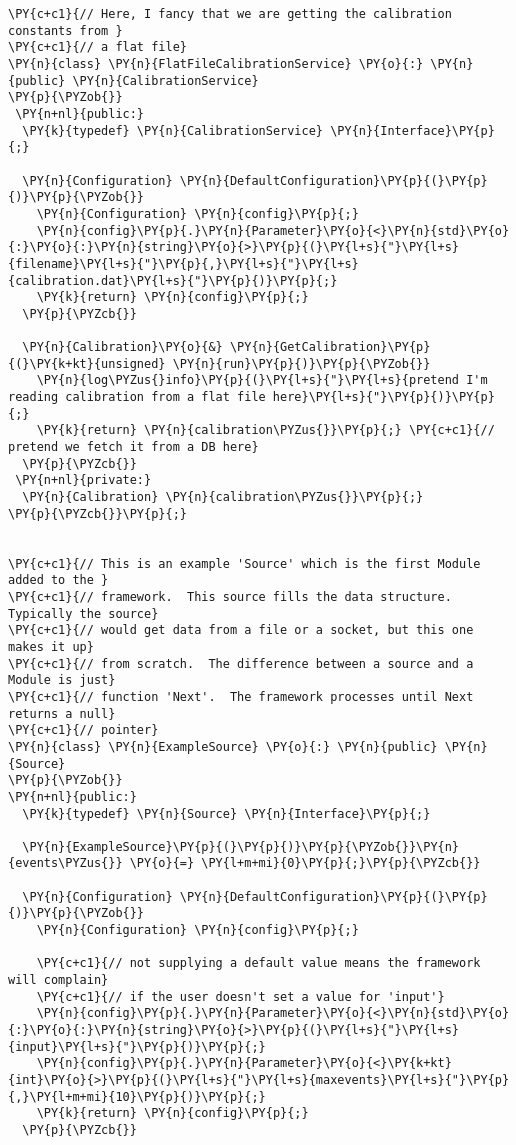 \begin{Verbatim}[commandchars=\\\{\}]
\PY{c+c1}{// Here, I fancy that we are getting the calibration constants from }
\PY{c+c1}{// a flat file}
\PY{n}{class} \PY{n}{FlatFileCalibrationService} \PY{o}{:} \PY{n}{public} \PY{n}{CalibrationService}
\PY{p}{\PYZob{}}
 \PY{n+nl}{public:}
  \PY{k}{typedef} \PY{n}{CalibrationService} \PY{n}{Interface}\PY{p}{;}

  \PY{n}{Configuration} \PY{n}{DefaultConfiguration}\PY{p}{(}\PY{p}{)}\PY{p}{\PYZob{}}
    \PY{n}{Configuration} \PY{n}{config}\PY{p}{;}
    \PY{n}{config}\PY{p}{.}\PY{n}{Parameter}\PY{o}{<}\PY{n}{std}\PY{o}{:}\PY{o}{:}\PY{n}{string}\PY{o}{>}\PY{p}{(}\PY{l+s}{"}\PY{l+s}{filename}\PY{l+s}{"}\PY{p}{,}\PY{l+s}{"}\PY{l+s}{calibration.dat}\PY{l+s}{"}\PY{p}{)}\PY{p}{;}
    \PY{k}{return} \PY{n}{config}\PY{p}{;}
  \PY{p}{\PYZcb{}}

  \PY{n}{Calibration}\PY{o}{&} \PY{n}{GetCalibration}\PY{p}{(}\PY{k+kt}{unsigned} \PY{n}{run}\PY{p}{)}\PY{p}{\PYZob{}}
    \PY{n}{log\PYZus{}info}\PY{p}{(}\PY{l+s}{"}\PY{l+s}{pretend I'm reading calibration from a flat file here}\PY{l+s}{"}\PY{p}{)}\PY{p}{;}
    \PY{k}{return} \PY{n}{calibration\PYZus{}}\PY{p}{;} \PY{c+c1}{// pretend we fetch it from a DB here}
  \PY{p}{\PYZcb{}}
 \PY{n+nl}{private:}
  \PY{n}{Calibration} \PY{n}{calibration\PYZus{}}\PY{p}{;}
\PY{p}{\PYZcb{}}\PY{p}{;}


\PY{c+c1}{// This is an example 'Source' which is the first Module added to the }
\PY{c+c1}{// framework.  This source fills the data structure.  Typically the source}
\PY{c+c1}{// would get data from a file or a socket, but this one makes it up}
\PY{c+c1}{// from scratch.  The difference between a source and a Module is just}
\PY{c+c1}{// function 'Next'.  The framework processes until Next returns a null}
\PY{c+c1}{// pointer}
\PY{n}{class} \PY{n}{ExampleSource} \PY{o}{:} \PY{n}{public} \PY{n}{Source}
\PY{p}{\PYZob{}}
\PY{n+nl}{public:}
  \PY{k}{typedef} \PY{n}{Source} \PY{n}{Interface}\PY{p}{;}

  \PY{n}{ExampleSource}\PY{p}{(}\PY{p}{)}\PY{p}{\PYZob{}}\PY{n}{events\PYZus{}} \PY{o}{=} \PY{l+m+mi}{0}\PY{p}{;}\PY{p}{\PYZcb{}}

  \PY{n}{Configuration} \PY{n}{DefaultConfiguration}\PY{p}{(}\PY{p}{)}\PY{p}{\PYZob{}}
    \PY{n}{Configuration} \PY{n}{config}\PY{p}{;}

    \PY{c+c1}{// not supplying a default value means the framework will complain}
    \PY{c+c1}{// if the user doesn't set a value for 'input'}
    \PY{n}{config}\PY{p}{.}\PY{n}{Parameter}\PY{o}{<}\PY{n}{std}\PY{o}{:}\PY{o}{:}\PY{n}{string}\PY{o}{>}\PY{p}{(}\PY{l+s}{"}\PY{l+s}{input}\PY{l+s}{"}\PY{p}{)}\PY{p}{;}
    \PY{n}{config}\PY{p}{.}\PY{n}{Parameter}\PY{o}{<}\PY{k+kt}{int}\PY{o}{>}\PY{p}{(}\PY{l+s}{"}\PY{l+s}{maxevents}\PY{l+s}{"}\PY{p}{,}\PY{l+m+mi}{10}\PY{p}{)}\PY{p}{;}
    \PY{k}{return} \PY{n}{config}\PY{p}{;}
  \PY{p}{\PYZcb{}}


\end{Verbatim}

